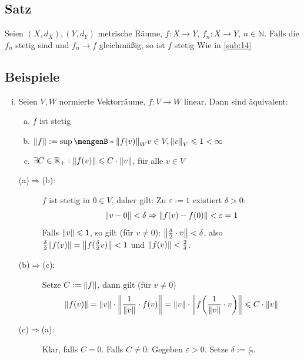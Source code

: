 \subsection[Satz über Stetigkeit des Grenzwertes einer Funktionenfolge in metrischen Räumen]{Satz} %
\label{sub:36}
Seien $(X,d_X), (Y,d_Y)$ metrische Räume, $f : X \to Y$, $f_n : X \to Y$, $n \in \mathds{N}$. Falls die $f_n$ stetig sind und $f_n \to f$ gleichmäßig, so ist $f$ stetig
Wie in \ref{sub:14} \bewende

\subsection{Beispiele} %
\label{sub:37}
\begin{enumerate}[(i)]
	\item \label{37:enum:1}
	Seien $V,W$ normierte Vektorräume, $f : V \to W$ linear. Dann sind äquivalent:
	\begin{enumerate}[a)]
		\item $f$ ist stetig
		\item $\norm{f} := \sup \set[ {\norm[W]{f(v)}} ]{v \in V, \norm[V]{v} \le 1 } < \infty $
		\item \label{37:enum:1:c}$\exists C \in \mathds{R}_+ : \norm{f(v)}\le C \cdot \norm{v} $, für alle $v \in V$
	\end{enumerate}
	\begin{description}
		\item[(a)$\Rightarrow$(b):] $f$ ist stetig in $0 \in V$, daher gilt: Zu $\varepsilon := 1$ existiert $\delta >0$:
		\[
			\norm{v-0} < \delta \Rightarrow  \norm{f(v)- f(0)} < \varepsilon = 1  
		\]
		Falls $\norm{v} \le 1 $, so gilt (für $v \not= 0$): $\norm{\frac{\delta }{2} \cdot v } < \delta$, also 
		$\frac{\delta }{2} \norm{f(v)} = \norm{f( \frac{\delta }{2} v)} < 1  $ und $\norm{f(v)}< \frac{2}{\delta}  $.
		\item[(b)$\Rightarrow$(c):] Setze $C:= \norm{f} $, dann gilt (für $v\not= 0$)
		\begin{align*}
			\norm{f(v)} =  \norm{v} \cdot  \norm{{\frac{1}{\norm{v}}} \cdot f(v)} = \norm{v} \cdot  \norm{f \enbrace*{ \frac{1}{\norm{v}} \cdot v } }  \le C \cdot \norm{v} 
		\end{align*}
		\item[(c)$\Rightarrow$(a):] Klar, falls $C=0$. Falls $C \not= 0$: Gegeben $\varepsilon >0$. Setze $\delta := \frac{\varepsilon}{C} $.
		\begin{align*}

\end{align*}
\end{description}
\end{enumerate}
